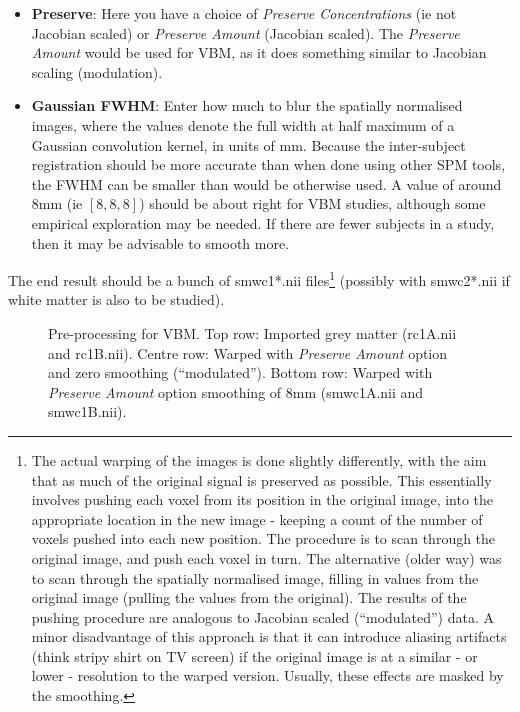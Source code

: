 \begin{itemize}
{\begin{itemize}
    \item{{\bf Preserve}: Here you have a choice of \emph{Preserve Concentrations} (ie not Jacobian scaled) or \emph{Preserve Amount} (Jacobian scaled).  The \emph{Preserve Amount} would be used for VBM, as it does something similar to Jacobian scaling (modulation).}
    \item{{\bf Gaussian FWHM}: Enter how much to blur the spatially normalised images, where the values denote the full width at half maximum of a Gaussian convolution kernel, in units of mm. Because the inter-subject registration should be more accurate than when done using other SPM tools, the FWHM can be smaller than would be otherwise used.  A value of around 8mm (ie $[8, 8, 8]$) should be about right for VBM studies, although some empirical exploration may be needed.  If there are fewer subjects in a study, then it may be advisable to smooth more.}
  \end{itemize}
}
\end{itemize}

The end result should be a bunch of smwc1*.nii files\footnote{The actual warping of the images is done slightly differently, with the aim that as much of the original signal is preserved as possible.  This essentially involves pushing each voxel from its position in the original image, into the appropriate location in the new image - keeping a count of the number of voxels pushed into each new position.  The procedure is to scan through the original image, and push each voxel in turn.  The alternative (older way) was to scan through the spatially normalised image, filling in values from the original image (pulling the values from the original).  The results of the pushing procedure are analogous to Jacobian scaled (``modulated'') data. A minor disadvantage of this approach is that it can introduce aliasing artifacts (think stripy shirt on TV screen) if the original image is at a similar - or lower - resolution to the warped version. Usually, these effects are masked by the smoothing.} (possibly with smwc2*.nii if white matter is also to be studied).

\begin{figure}
\begin{center}
\end{center}
\caption{
Pre-processing for VBM.
Top row: Imported grey matter (rc1A.nii and rc1B.nii).
Centre row: Warped with \emph{Preserve Amount} option and zero smoothing (``modulated'').
Bottom row: Warped with \emph{Preserve Amount} option smoothing of 8mm (smwc1A.nii and smwc1B.nii).
\label{Fig:VBM}}
\end{figure}

